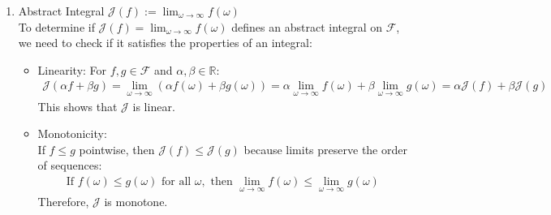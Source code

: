 \documentclass{report}
\begin{document}
{\begin{myproof}
\begin{enumerate}
\begin{itemize}
\item Distributive Property:\\
For all \(f, g, h \in \mathcal{F}\):
     \begin{align*}
     f \vee (g \wedge h) = (f \vee g) \wedge (f \vee h)
     \end{align*}
This follows from the properties of \(\max\) and \(\min\) functions.

\item Pseudocomplement:\\
The pseudocomplement of a function \(f \in \mathcal{F}\) is another function \(g \in \mathcal{F}\) such that \(f \wedge g = 0\) (pointwise zero) and \(f \vee g\) is the smallest function with this property.
\end{itemize}
Therefore, \(\mathcal{F}\) satisfies the requirements to be a Stone lattice.

\item Abstract Integral \(\mathcal{J}(f) := \lim_{\omega \to \infty} f(\omega)\)\\
To determine if \(\mathcal{J}(f) = \lim_{\omega \to \infty} f(\omega)\) defines an abstract integral on \(\mathcal{F}\), we need to check if it satisfies the properties of an integral:
\begin{itemize}
\item Linearity:
For \(f, g \in \mathcal{F}\) and \(\alpha, \beta \in \mathbb{R}\):
     \begin{align*}
     \mathcal{J}(\alpha f + \beta g) = \lim_{\omega \to \infty} (\alpha f(\omega) + \beta g(\omega)) = \alpha \lim_{\omega \to \infty} f(\omega) + \beta \lim_{\omega \to \infty} g(\omega) = \alpha \mathcal{J}(f) + \beta \mathcal{J}(g)
     \end{align*}
This shows that \(\mathcal{J}\) is linear.

\item Monotonicity:\\
If \(f \leq g\) pointwise, then \(\mathcal{J}(f) \leq \mathcal{J}(g)\) because limits preserve the order of sequences:
     \begin{align*}
     \text{If } f(\omega) \leq g(\omega) \text{ for all } \omega, \text{ then } \lim_{\omega \to \infty} f(\omega) \leq \lim_{\omega \to \infty} g(\omega)
     \end{align*}
Therefore, \(\mathcal{J}\) is monotone.


\end{itemize}
\end{enumerate}
\end{myproof}}
\end{document}

